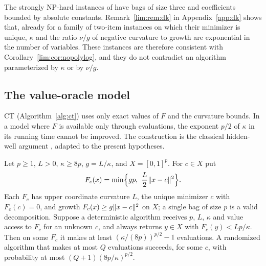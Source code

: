 The strongly NP-hard instances of \cite[Theorem~3]{DelPiaKhajavirad2026}
have bags of size three and coefficients bounded by absolute constants.
Remark~\ref{lim:rem:dk} in Appendix~\ref{app:dk} shows that, already for a
family of two-item instances on which their minimizer is unique, $\kappa$ and
the ratio $\nu/g$ of negative curvature to growth are exponential in the
number of variables. These instances are therefore consistent with
Corollary~\ref{lim:cor:nopolylog}, and they do not contradict an algorithm
parameterized by $\kappa$ or by $\nu/g$.

\subsection{The value-oracle model}\label{sec:limits-oracle}

CT (Algorithm~\ref{alg:ct}) uses only exact values of $F$ and the curvature
bounds. In a model where $F$ is available only through evaluations, the
exponent $p/2$ of $\kappa$ in its running time cannot be improved. The
construction is the classical hidden-well argument
\cite{NemirovskiYudin1983}, adapted to the present hypotheses.

\begin{proposition}\label{lim:prop:oracle}
Let $p\ge1$, $L>0$, $\kappa\ge8p$, $g=L/\kappa$, and $X=[0,1]^p$. For
$c\in X$ put
\[
F_c(x)=\min\Bigl\{gp,\ \frac L2\lVert x-c\rVert^2\Bigr\}.
\]
Each $F_c$ has upper coordinate curvature $L$, the unique minimizer $c$
with $F_c(c)=0$, and growth $F_c(x)\ge g\lVert x-c\rVert^2$ on $X$; a single
bag of size $p$ is a valid decomposition. Suppose a deterministic algorithm
receives $p$, $L$, $\kappa$ and value access to $F_c$ for an unknown $c$,
and always returns $y\in X$ with $F_c(y)<Lp/\kappa$. Then on some $F_c$ it
makes at least $(\kappa/(8p))^{p/2}-1$ evaluations. A randomized algorithm
that makes at most $Q$ evaluations succeeds, for some $c$, with probability
at most $(Q+1)(8p/\kappa)^{p/2}$.
\end{proposition}

